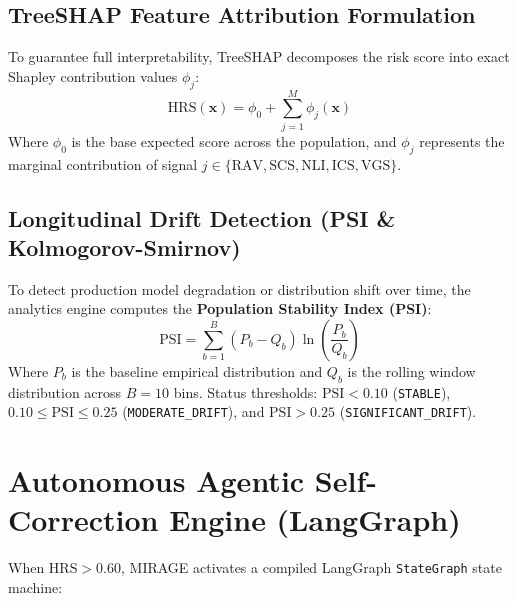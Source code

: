 \documentclass[11pt,a4paper]{article}
\begin{document}
\subsection{TreeSHAP Feature Attribution Formulation}
To guarantee full interpretability, TreeSHAP decomposes the risk score into exact Shapley contribution values $\phi_j$:
\begin{equation}
\text{HRS}(\mathbf{x}) = \phi_0 + \sum_{j=1}^M \phi_j(\mathbf{x})
\end{equation}
Where $\phi_0$ is the base expected score across the population, and $\phi_j$ represents the marginal contribution of signal $j \in \{\text{RAV}, \text{SCS}, \text{NLI}, \text{ICS}, \text{VGS}\}$.

\subsection{Longitudinal Drift Detection (PSI \& Kolmogorov-Smirnov)}
To detect production model degradation or distribution shift over time, the analytics engine computes the \textbf{Population Stability Index (PSI)}:
\begin{equation}
\text{PSI} = \sum_{b=1}^B (P_b - Q_b) \ln\left(\frac{P_b}{Q_b}\right)
\end{equation}
Where $P_b$ is the baseline empirical distribution and $Q_b$ is the rolling window distribution across $B=10$ bins. Status thresholds: $\text{PSI} < 0.10$ (\texttt{STABLE}), $0.10 \le \text{PSI} \le 0.25$ (\texttt{MODERATE\_DRIFT}), and $\text{PSI} > 0.25$ (\texttt{SIGNIFICANT\_DRIFT}).

\section{Autonomous Agentic Self-Correction Engine (LangGraph)}

When $\text{HRS} > 0.60$, MIRAGE activates a compiled LangGraph \texttt{StateGraph} state machine:
\end{document}
